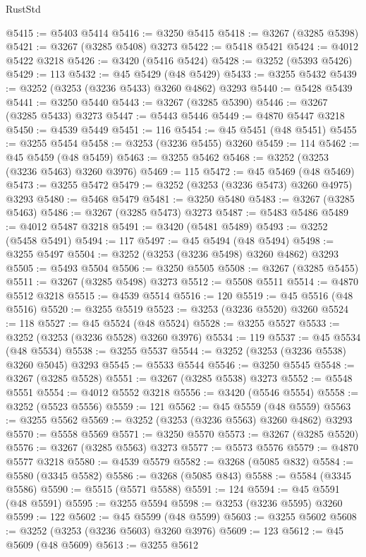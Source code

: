 \begin{lexlean}{RustStd}
\begin{coremodule}
{\begin{coremodule}
{{{{{{{{{{{{{{{{{{{{{{{{{{{{{{{{{{{{{{{@5415 := @5403 @5414
@5416 := @3250 @5415
@5418 := @3267 (@3285 @5398)
@5421 := @3267 (@3285 @5408) @3273
@5422 := @5418 @5421
@5424 := @4012 @5422 @3218
@5426 := @3420 (@5416 @5424)
@5428 := @3252 (@5393 @5426)
@5429 := 113
@5432 := @45 @5429 (@48 @5429)
@5433 := @3255 @5432
@5439 := @3252 (@3253 (@3236 @5433) @3260 @4862) @3293
@5440 := @5428 @5439
@5441 := @3250 @5440
@5443 := @3267 (@3285 @5390)
@5446 := @3267 (@3285 @5433) @3273
@5447 := @5443 @5446
@5449 := @4870 @5447 @3218
@5450 := @4539 @5449
@5451 := 116
@5454 := @45 @5451 (@48 @5451)
@5455 := @3255 @5454
@5458 := @3253 (@3236 @5455) @3260
@5459 := 114
@5462 := @45 @5459 (@48 @5459)
@5463 := @3255 @5462
@5468 := @3252 (@3253 (@3236 @5463) @3260 @3976)
@5469 := 115
@5472 := @45 @5469 (@48 @5469)
@5473 := @3255 @5472
@5479 := @3252 (@3253 (@3236 @5473) @3260 @4975) @3293
@5480 := @5468 @5479
@5481 := @3250 @5480
@5483 := @3267 (@3285 @5463)
@5486 := @3267 (@3285 @5473) @3273
@5487 := @5483 @5486
@5489 := @4012 @5487 @3218
@5491 := @3420 (@5481 @5489)
@5493 := @3252 (@5458 @5491)
@5494 := 117
@5497 := @45 @5494 (@48 @5494)
@5498 := @3255 @5497
@5504 := @3252 (@3253 (@3236 @5498) @3260 @4862) @3293
@5505 := @5493 @5504
@5506 := @3250 @5505
@5508 := @3267 (@3285 @5455)
@5511 := @3267 (@3285 @5498) @3273
@5512 := @5508 @5511
@5514 := @4870 @5512 @3218
@5515 := @4539 @5514
@5516 := 120
@5519 := @45 @5516 (@48 @5516)
@5520 := @3255 @5519
@5523 := @3253 (@3236 @5520) @3260
@5524 := 118
@5527 := @45 @5524 (@48 @5524)
@5528 := @3255 @5527
@5533 := @3252 (@3253 (@3236 @5528) @3260 @3976)
@5534 := 119
@5537 := @45 @5534 (@48 @5534)
@5538 := @3255 @5537
@5544 := @3252 (@3253 (@3236 @5538) @3260 @5045) @3293
@5545 := @5533 @5544
@5546 := @3250 @5545
@5548 := @3267 (@3285 @5528)
@5551 := @3267 (@3285 @5538) @3273
@5552 := @5548 @5551
@5554 := @4012 @5552 @3218
@5556 := @3420 (@5546 @5554)
@5558 := @3252 (@5523 @5556)
@5559 := 121
@5562 := @45 @5559 (@48 @5559)
@5563 := @3255 @5562
@5569 := @3252 (@3253 (@3236 @5563) @3260 @4862) @3293
@5570 := @5558 @5569
@5571 := @3250 @5570
@5573 := @3267 (@3285 @5520)
@5576 := @3267 (@3285 @5563) @3273
@5577 := @5573 @5576
@5579 := @4870 @5577 @3218
@5580 := @4539 @5579
@5582 := @3268 (@5085 @832)
@5584 := @5580 (@3345 @5582)
@5586 := @3268 (@5085 @843)
@5588 := @5584 (@3345 @5586)
@5590 := @5515 (@5571 @5588)
@5591 := 124
@5594 := @45 @5591 (@48 @5591)
@5595 := @3255 @5594
@5598 := @3253 (@3236 @5595) @3260
@5599 := 122
@5602 := @45 @5599 (@48 @5599)
@5603 := @3255 @5602
@5608 := @3252 (@3253 (@3236 @5603) @3260 @3976)
@5609 := 123
@5612 := @45 @5609 (@48 @5609)
@5613 := @3255 @5612
}}}}}}}}}}}}}}}}}}}}}}}}}}}}}}}}}}}}}}}
\end{coremodule}}
\end{coremodule}
\end{lexlean}
